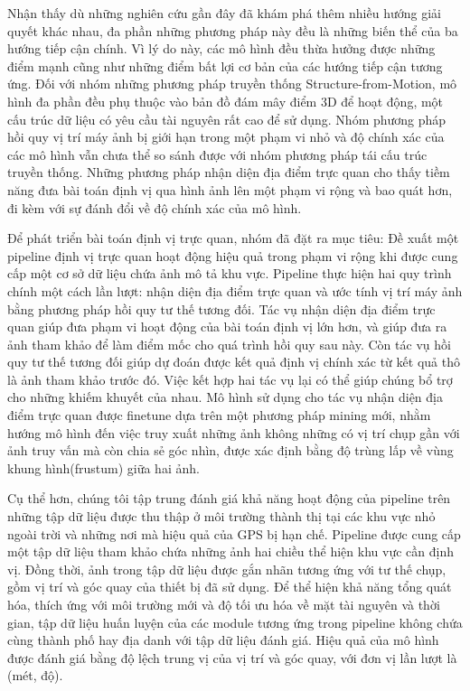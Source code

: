 Nhận thấy dù những nghiên cứu gần đây đã khám phá thêm nhiều hướng giải quyết khác nhau, đa phần những phương pháp này đều là những biến thể của ba hướng tiếp cận chính. Vì lý do này, các mô hình đều thừa hưởng được những điểm mạnh cũng như những điểm bất lợi cơ bản của các hướng tiếp cận tương ứng. Đối với nhóm những phương pháp truyền thống Structure-from-Motion, mô hình đa phần đều phụ thuộc vào bản đồ đám mây điểm 3D để hoạt động, một cấu trúc dữ liệu có yêu cầu tài nguyên rất cao để sử dụng. Nhóm phương pháp hồi quy vị trí máy ảnh bị giới hạn trong một phạm vi nhỏ và độ chính xác của các mô hình vẫn chưa thể so sánh được với nhóm phương pháp tái cấu trúc truyền thống. Những phương pháp nhận diện địa điểm trực quan cho thấy tiềm năng đưa bài toán định vị qua hình ảnh lên một phạm vi rộng và bao quát hơn, đi kèm với sự đánh đổi về độ chính xác của mô hình.

Để phát triển bài toán định vị trực quan, nhóm đã đặt ra mục tiêu: Đề xuất một pipeline định vị trực quan hoạt động hiệu quả trong phạm vi rộng khi được cung cấp một cơ sở dữ liệu chứa ảnh mô tả khu vực. Pipeline thực hiện hai quy trình chính một cách lần lượt: nhận diện địa điểm trực quan và ước tính vị trí máy ảnh bằng phương pháp hồi quy tư thế tương đối. Tác vụ nhận diện địa điểm trực quan giúp đưa phạm vi hoạt động của bài toán định vị lớn hơn, và giúp đưa ra ảnh tham khảo để làm điểm mốc cho quá trình hồi quy sau này. Còn tác vụ hồi quy tư thế tương đối giúp dự đoán được kết quả định vị chính xác từ kết quả thô là ảnh tham khảo trước đó. Việc kết hợp hai tác vụ lại có thể giúp chúng bổ trợ cho những khiếm khuyết của nhau. Mô hình sử dụng cho tác vụ nhận diện địa điểm trực quan được finetune dựa trên một phương pháp mining mới, nhằm hướng mô hình đến việc truy xuất những ảnh không những có vị trí chụp gần với ảnh truy vấn mà còn chia sẻ góc nhìn, được xác định bằng độ trùng lấp về vùng khung hình(frustum) giữa hai ảnh.

Cụ thể hơn, chúng tôi tập trung đánh giá khả năng hoạt động của pipeline trên những tập dữ liệu được thu thập ở môi trường thành thị tại các khu vực nhỏ ngoài trời và những nơi mà hiệu quả của GPS bị hạn chế. Pipeline được cung cấp một tập dữ liệu tham khảo chứa những ảnh hai chiều thể hiện khu vực cần định vị. Đồng thời, ảnh trong tập dữ liệu được gắn nhãn tương ứng với tư thế chụp, gồm vị trí và góc quay của thiết bị đã sử dụng. Để thể hiện khả năng tổng quát hóa, thích ứng với môi trường mới và độ tối ưu hóa về mặt tài nguyên và thời gian, tập dữ liệu huấn luyện của các module tương ứng trong pipeline không chứa cùng thành phố hay địa danh với tập dữ liệu đánh giá. Hiệu quả của mô hình được đánh giá bằng độ lệch trung vị của vị trí và góc quay, với đơn vị lần lượt là (mét, độ).

